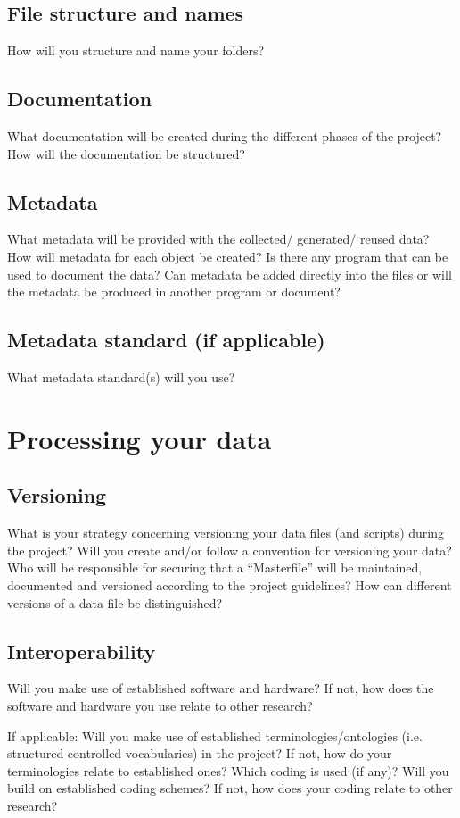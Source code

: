 \documentclass[11pt,a4paper]{article}
\begin{document}
	\subsection{File structure and names}
	How will you structure and name your folders?
	\subsection{Documentation}
	What documentation will be created during the different phases of the project?
	How will the documentation be structured?
	\subsection{Metadata}
	What metadata will be provided with the collected/ generated/ reused data?
	How will metadata for each object be created?
	Is there any program that can be used to document the data?
	Can metadata be added directly into the files or will the metadata be produced in another
	program or document?
	\subsection{Metadata standard (if applicable)}
	What metadata standard(s) will you use?
	
	\section{Processing your data}
	\subsection{Versioning}
	What is your strategy concerning versioning your data files (and scripts) during the project?
	Will you create and/or follow a convention for versioning your data?
	Who will be responsible for securing that a “Masterfile” will be maintained, documented
	and versioned according to the project guidelines?
	How can different versions of a data file be distinguished?
	
	\subsection{Interoperability}
	Will you make use of established software and hardware? If not, how does the software
	and hardware you use relate to other research?
	
	If applicable:
	Will you make use of established terminologies/ontologies (i.e. structured controlled
	vocabularies) in the project? If not, how do your terminologies relate to established
	ones?
	Which coding is used (if any)? Will you build on established coding schemes? If not,
	how does your coding relate to other research?
	
\end{document}
